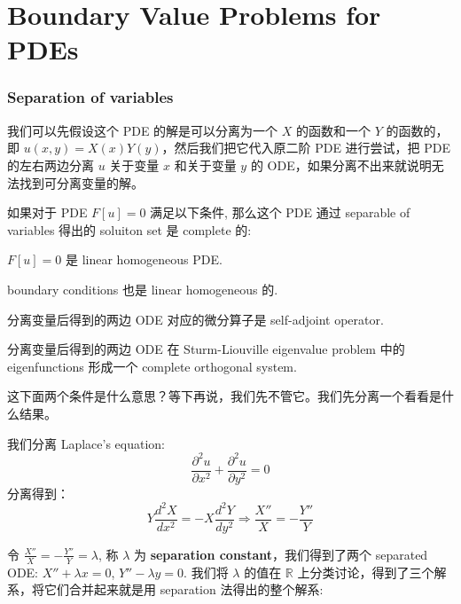 \chapter{Boundary Value Problems for PDEs}
\subsection{Separation of variables}
我们可以先假设这个 PDE 的解是可以分离为一个 $X$ 的函数和一个 $Y$ 的函数的，即 $u(x,y) = X(x)Y(y)$，然后我们把它代入原二阶 PDE 进行尝试，把 PDE 的左右两边分离 $u$ 关于变量 $x$ 和关于变量 $y$ 的 ODE，如果分离不出来就说明无法找到可分离变量的解。
\\

\begin{theorem}
    如果对于 PDE $F[u] = 0$ 满足以下条件, 那么这个 PDE 通过 separable of variables 得出的 soluiton set 是 complete 的:\\
    \begin{compactenumI}
    \item $F[u] = 0$ 是 linear homogeneous PDE.
    \item boundary conditions 也是 linear homogeneous 的.
    \item 分离变量后得到的两边 ODE 对应的微分算子是 self-adjoint operator.
    \item 分离变量后得到的两边 ODE 在 Sturm-Liouville eigenvalue problem 中的 eigenfunctions 形成一个 complete orthogonal system.
\end{compactenumI}
\end{theorem}
这下面两个条件是什么意思？等下再说，我们先不管它。我们先分离一个看看是什么结果。

我们分离 Laplace's equation:
$$
\frac{\partial ^2 u}{\partial x ^ 2} + \frac{\partial ^2 u}{\partial y ^ 2} = 0
$$
分离得到：
$$
Y \frac{d^2 X}{dx^2} = -X \frac{d^2 Y}{dy^2} \Rightarrow  \frac{X''}{X} = - \frac{Y''}{Y}
$$

令 $\frac{X''}{X} = - \frac{Y''}{Y} = \lambda$, 称 $\lambda$ 为 \textbf{separation constant}，我们得到了两个 separated ODE: $X'' + \lambda x = 0$, $Y'' - \lambda y = 0$.
我们将 $\lambda$ 的值在 $\mathbb{R}$ 上分类讨论，得到了三个解系，将它们合并起来就是用 separation 法得出的整个解系:

